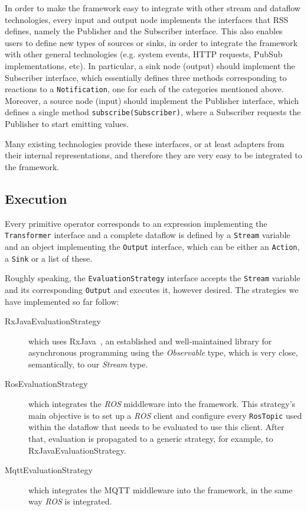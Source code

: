 \documentclass[sigplan,screen,review,anonymous]{acmart}
\begin{document}
In order to make the framework easy to integrate with other stream and
dataflow technologies, every input and output node implements the interfaces
that RSS defines, namely the Publisher and the Subscriber interface. This also
enables users to define new types of sources or sinks, in order to integrate
the framework with other general technologies (e.g. system events, HTTP requests,
PubSub implementations, etc).
%
In particular, a sink node (output) should implement the Subscriber interface, which
essentially defines three methods corresponding to reactions to a
\texttt{Notification}, one for each of the categories mentioned above.
%
Moreover, a source node (input) should implement the Publisher interface, which defines a
single method \texttt{subscribe(Subscriber)}, where a Subscriber requests the
Publisher to start emitting values.

Many existing technologies provide these interfaces, or at least adapters from
their internal representations, and therefore they are very easy to be
integrated to the framework.

\subsection{Execution}

Every primitive operator corresponds to an expression implementing the
\texttt{Transformer} interface and a complete dataflow is defined by a
\texttt{Stream} variable and an object implementing the \texttt{Output} interface,
which can be either an \texttt{Action}, a \texttt{Sink} or a list of these.

Roughly speaking, the \texttt{EvaluationStrategy} interface accepts the
\texttt{Stream} variable and its corresponding \texttt{Output} and executes it,
however desired. The strategies we have implemented so far follow:
\begin{description}
\item[RxJavaEvaluationStrategy]
which uses RxJava~, an established and well-maintained library for
asynchronous programming using the \textit{Observable} type, which is very close,
semantically, to our \textit{Stream} type.

\item[RosEvaluationStrategy] which integrates the \textit{ROS} middleware into the
framework. This strategy's main objective is to set up a \textit{ROS} client and
configure every \texttt{RosTopic} used within the dataflow that needs to be
evaluated to use this client. After that, evaluation is propagated to a generic
strategy, for example, to RxJavaEvaluationStrategy.

\item[MqttEvaluationStrategy] which integrates the MQTT middleware into the
framework, in the same way \textit{ROS} is integrated.

\end{description}
\end{document}
